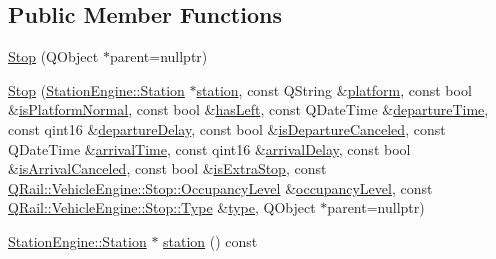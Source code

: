\subsection*{Public Member Functions}
\begin{DoxyCompactItemize}
\item 
\mbox{\hyperlink{classQRail_1_1VehicleEngine_1_1Stop_a6cec2d0d24b71a12da7c50feaa015f8b}{Stop}} (Q\+Object $\ast$parent=nullptr)
\item 
\mbox{\hyperlink{classQRail_1_1VehicleEngine_1_1Stop_ac2ec37e26949dacae494aa26e16118c3}{Stop}} (\mbox{\hyperlink{classQRail_1_1StationEngine_1_1Station}{Station\+Engine\+::\+Station}} $\ast$\mbox{\hyperlink{classQRail_1_1VehicleEngine_1_1Stop_a9a481db5e15c322b04f4b2857d6f210e}{station}}, const Q\+String \&\mbox{\hyperlink{classQRail_1_1VehicleEngine_1_1Stop_aeac459a67a5a85d5972c7f0256e85a68}{platform}}, const bool \&\mbox{\hyperlink{classQRail_1_1VehicleEngine_1_1Stop_a879cdef01cdd3fbe3f735e52c6de23b0}{is\+Platform\+Normal}}, const bool \&\mbox{\hyperlink{classQRail_1_1VehicleEngine_1_1Stop_a7e349af1d43bbf153a156992df8491c1}{has\+Left}}, const Q\+Date\+Time \&\mbox{\hyperlink{classQRail_1_1VehicleEngine_1_1Stop_a4ed1b04b9d3d2fe4ac907854cc3e67c2}{departure\+Time}}, const qint16 \&\mbox{\hyperlink{classQRail_1_1VehicleEngine_1_1Stop_a6ef54344f808db033bda9da30d74bac4}{departure\+Delay}}, const bool \&\mbox{\hyperlink{classQRail_1_1VehicleEngine_1_1Stop_a887692087d13ec4cd93c60560be9c72a}{is\+Departure\+Canceled}}, const Q\+Date\+Time \&\mbox{\hyperlink{classQRail_1_1VehicleEngine_1_1Stop_a09c5419b7717b2849613cb500ce4b029}{arrival\+Time}}, const qint16 \&\mbox{\hyperlink{classQRail_1_1VehicleEngine_1_1Stop_a95e36a003e044cf7c454843bb9ea3f2c}{arrival\+Delay}}, const bool \&\mbox{\hyperlink{classQRail_1_1VehicleEngine_1_1Stop_a432b40594e1ceb559bb1a5bcc19cbcd3}{is\+Arrival\+Canceled}}, const bool \&\mbox{\hyperlink{classQRail_1_1VehicleEngine_1_1Stop_aeebc79d39ddfed82ea2c44f0e7cd0a95}{is\+Extra\+Stop}}, const \mbox{\hyperlink{classQRail_1_1VehicleEngine_1_1Stop_ad967ed81b19762bd582c1af07354a6d4}{Q\+Rail\+::\+Vehicle\+Engine\+::\+Stop\+::\+Occupancy\+Level}} \&\mbox{\hyperlink{classQRail_1_1VehicleEngine_1_1Stop_ac43fa877d20d44b9a46ac1e584423f48}{occupancy\+Level}}, const \mbox{\hyperlink{classQRail_1_1VehicleEngine_1_1Stop_af078938bc06ff906b6fc843d8c0206fa}{Q\+Rail\+::\+Vehicle\+Engine\+::\+Stop\+::\+Type}} \&\mbox{\hyperlink{classQRail_1_1VehicleEngine_1_1Stop_abe8f35c16d98f1ea6bd95a525f90c0aa}{type}}, Q\+Object $\ast$parent=nullptr)
\item 
\mbox{\hyperlink{classQRail_1_1StationEngine_1_1Station}{Station\+Engine\+::\+Station}} $\ast$ \mbox{\hyperlink{classQRail_1_1VehicleEngine_1_1Stop_a9a481db5e15c322b04f4b2857d6f210e}{station}} () const

\end{DoxyCompactItemize}
